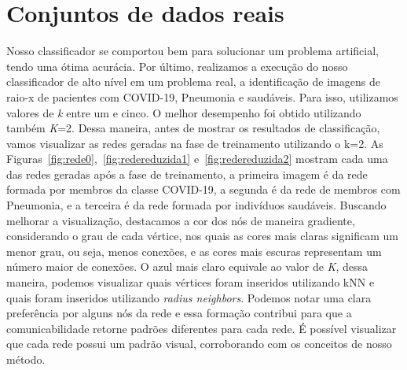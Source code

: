 \documentclass[
12pt,        %
oneside,     %
a4paper,     %
english,       %
brazil        %
%
%
]{ppgca}
\begin{document}
\section{Conjuntos de dados reais}
Nosso classificador se comportou bem para solucionar um problema artificial, tendo uma ótima acurácia. Por último, realizamos a execução do nosso classificador de alto nível em um problema real, a identificação de imagens de raio-x de pacientes com COVID-19, Pneumonia e saudáveis. Para isso, utilizamos valores de \textit{k} entre um e cinco. O melhor desempenho foi obtido utilizando também \textit{K}=2. Dessa maneira, antes de mostrar os resultados de classificação, vamos visualizar as redes geradas na fase de treinamento utilizando o k=2. As Figuras~\ref{fig:rede0},~\ref{fig:redereduzida1} e~\ref{fig:redereduzida2} mostram cada uma das redes geradas após a fase de treinamento, a primeira imagem é da rede formada por membros da classe COVID-19, a segunda é da rede de membros com Pneumonia, e a terceira é da rede formada por indivíduos saudáveis. Buscando melhorar a visualização, destacamos a cor dos nós de maneira gradiente, considerando o grau de cada vértice, nos quais as cores mais claras significam um menor grau, ou seja, menos conexões, e as cores mais escuras representam um número maior de conexões. O azul mais claro equivale ao valor de \textit{K}, dessa maneira, podemos visualizar quais vértices foram inseridos utilizando kNN e quais foram inseridos utilizando \textit{radius neighbors}. Podemos notar uma clara preferência por alguns nós da rede e essa formação contribui para que a comunicabilidade retorne padrões diferentes para cada rede. É possível visualizar que cada rede possui um padrão visual, corroborando com os conceitos de nosso método.
\end{document}

